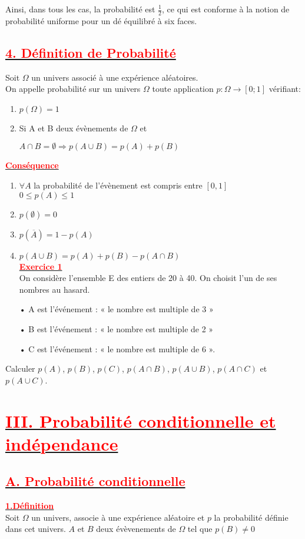 \documentclass[12pt]{article}
\begin{document}
Ainsi, dans tous les cas, la probabilité est $\frac{1}{2}$, ce qui est conforme à la notion de probabilité uniforme pour un dé équilibré à six faces.
\subsection*{\underline{\textbf{\textcolor{red}{4. Définition de Probabilité}}}}
Soit $\Omega$ un univers associé à une expérience aléatoires.\\
On appelle probabilité sur un univers $\Omega$ toute application 
$p:\Omega \rightarrow[0;1]$ vérifiant:
\begin{enumerate}
\item $p(\Omega)=1$
\item Si A et B deux évènements de $\Omega$ et

$A\cap B=\emptyset \Longrightarrow p(A\cup B)=p(A)+p(B)$
\end{enumerate}
\underline{\textbf{\textcolor{red}{Conséquence}}}\\
\begin{enumerate}
\item $\forall A$ la probabilité de l'évènement est compris entre $[0,1]$\\
$0 \leq p(A)\leq 1$
\item $p(\emptyset)=0$
\item$p(\overline{A})=1-p(A)$
\item $p(A \cup B)=p(A)+p(B)-p(A\cap B)$\\
\underline{\textbf{\textcolor{red}{Exercice 1}}}\\
On considère l’ensemble E des entiers de 20 à 40. On choisit l’un de ses nombres au hasard.
\end{enumerate}
\begin{itemize}
\item[•] A est l’événement : « le nombre est multiple de 3 »
\item[•] B est l’événement : « le nombre est multiple de 2 »
\item[•] C est l’événement : « le nombre est multiple de 6 ».
\end{itemize}
Calculer $p(A)$, $p(B)$, $p(C)$, $p(A\cap B)$, $p(A\cup B)$, $p(A\cap C)$ et $p(A\cup C)$.

\section*{\underline{\textbf{\textcolor{red}{III. Probabilité conditionnelle et indépendance}}}}
\subsection*{\underline{\textbf{\textcolor{red}{A. Probabilité conditionnelle}}}}
\underline{\textbf{\textcolor{red}{1.Définition}}}\\
Soit $\Omega$ un univers, associe à une expérience aléatoire et $p$ la probabilité définie dans cet univers. $A$ et $B$ deux évèvenements de $\Omega$ tel que $p(B)\neq 0$
\end{document}
